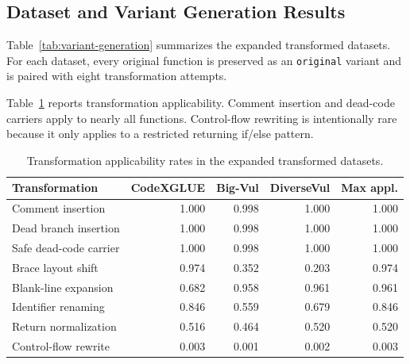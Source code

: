 \documentclass[a4paper,fleqn]{cas-dc}
\begin{document}
\subsection{Dataset and Variant Generation Results}

Table~\ref{tab:variant-generation} summarizes the expanded transformed
datasets. For each dataset, every original function is preserved as an
\texttt{original} variant and is paired with eight transformation attempts.

\begin{table}[t]
  \centering
  \caption{Generated transformed variants for the prepared datasets.}
  \label{tab:variant-generation}
\end{table}

Table~\ref{tab:applicability} reports transformation applicability. Comment
insertion and dead-code carriers apply to nearly all functions. Control-flow
rewriting is intentionally rare because it only applies to a restricted
returning if/else pattern.

\begin{table}[t]
  \centering
  \caption{Transformation applicability rates in the expanded transformed datasets.}
  \label{tab:applicability}
  \begin{tabular}{lrrrr}
    \toprule
    Transformation & CodeXGLUE & Big-Vul & DiverseVul & Max appl. \\
    \midrule
    Comment insertion & 1.000 & 0.998 & 1.000 & 1.000 \\
    Dead branch insertion & 1.000 & 0.998 & 1.000 & 1.000 \\
    Safe dead-code carrier & 1.000 & 0.998 & 1.000 & 1.000 \\
    Brace layout shift & 0.974 & 0.352 & 0.203 & 0.974 \\
    Blank-line expansion & 0.682 & 0.958 & 0.961 & 0.961 \\
    Identifier renaming & 0.846 & 0.559 & 0.679 & 0.846 \\
    Return normalization & 0.516 & 0.464 & 0.520 & 0.520 \\
    Control-flow rewrite & 0.003 & 0.001 & 0.002 & 0.003 \\
    \bottomrule
  \end{tabular}
\end{table}
\end{document}
